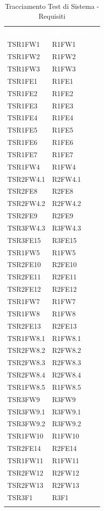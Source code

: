 \renewcommand{\arraystretch}{1.5}
\begin{longtable}{ m{}<{\centering}  m{}<{\centering} }
	\rowcolor{darkblue}
	\textcolor{white}{\textbf{ID Test}} &\textcolor{white}{\textbf{ID Requisito}}\\ 
	 
	TSR1FW1 & R1FW1 \\
	TSR1FW2 &  R1FW2 \\
	TSR1FW3 & R1FW3 \\
	TSR1FE1 & R1FE1 \\
	TSR1FE2 & R1FE2 \\
	TSR1FE3 & R1FE3 \\
	TSR1FE4 & R1FE4 \\
	TSR1FE5 & R1FE5 \\
	TSR1FE6 & R1FE6 \\
	TSR1FE7 & R1FE7 \\
	TSR1FW4 & R1FW4 \\
	TSR2FW4.1 & R2FW4.1 \\
	TSR2FE8 & R2FE8 \\
	TSR2FW4.2 & R2FW4.2 \\
	TSR2FE9 & R2FE9 \\
	TSR3FW4.3 & R3FW4.3\\
	TSR3FE15 & R3FE15 \\
	TSR1FW5 & R1FW5 \\
	TSR2FE10 & R2FE10 \\	 
	TSR2FE11 & R2FE11 \\
	TSR2FE12 & R2FE12 \\
	TSR1FW7 & R1FW7 \\
	TSR1FW8 & R1FW8 \\
	TSR2FE13 & R2FE13 \\
	TSR1FW8.1 & R1FW8.1 \\
	TSR2FW8.2 & R2FW8.2 \\
	TSR2FW8.3 & R2FW8.3 \\
	TSR2FW8.4 & R2FW8.4 \\
	TSR1FW8.5 & R1FW8.5 \\
	TSR3FW9 & R3FW9 \\
	TSR3FW9.1 & R3FW9.1 \\
	TSR3FW9.2 & R3FW9.2 \\
	TSR1FW10 & R1FW10 \\
	TSR2FE14 & R2FE14  \\
	TSR1FW11 & R1FW11 \\
	TSR2FW12 & R2FW12 \\
	TSR2FW13 & R2FW13 \\
	TSR3F1 & R3F1 \\

\caption{Tracciamento Test di Sistema - Requisiti}
\end{longtable}


